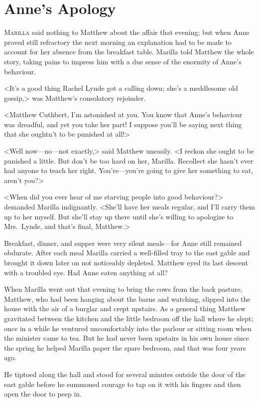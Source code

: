 \chapter{Anne's Apology}

\lettrine{M}{arilla} said nothing to Matthew about the affair that evening; but when Anne proved still refractory the next morning an explanation had to be made to account for her absence from the breakfast table. Marilla told Matthew the whole story, taking pains to impress him with a due sense of the enormity of Anne's behaviour.

<It's a good thing Rachel Lynde got a calling down; she's a meddlesome old gossip,> was Matthew's consolatory rejoinder.

<Matthew Cuthbert, I'm astonished at you. You know that Anne's behaviour was dreadful, and yet you take her part! I suppose you'll be saying next thing that she oughtn't to be punished at all!>

<Well now—no—not exactly,> said Matthew uneasily. <I reckon she ought to be punished a little. But don't be too hard on her, Marilla. Recollect she hasn't ever had anyone to teach her right. You're—you're going to give her something to eat, aren't you?>

<When did you ever hear of me starving people into good behaviour?> demanded Marilla indignantly. <She'll have her meals regular, and I'll carry them up to her myself. But she'll stay up there until she's willing to apologize to Mrs.~Lynde, and that's final, Matthew.>

Breakfast, dinner, and supper were very silent meals—for Anne still remained obdurate. After each meal Marilla carried a well-filled tray to the east gable and brought it down later on not noticeably depleted. Matthew eyed its last descent with a troubled eye. Had Anne eaten anything at all?

When Marilla went out that evening to bring the cows from the back pasture, Matthew, who had been hanging about the barns and watching, slipped into the house with the air of a burglar and crept upstairs. As a general thing Matthew gravitated between the kitchen and the little bedroom off the hall where he slept; once in a while he ventured uncomfortably into the parlour or sitting room when the minister came to tea. But he had never been upstairs in his own house since the spring he helped Marilla paper the spare bedroom, and that was four years ago.

He tiptoed along the hall and stood for several minutes outside the door of the east gable before he summoned courage to tap on it with his fingers and then open the door to peep in.

